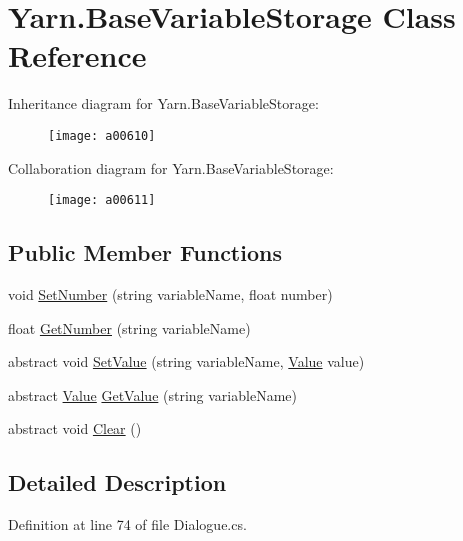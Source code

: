 \hypertarget{a00042}{\section{Yarn.\-Base\-Variable\-Storage Class Reference}
\label{a00042}
}


Inheritance diagram for Yarn.\-Base\-Variable\-Storage\-:
\nopagebreak
\begin{figure}[H]
\begin{center}
\leavevmode
\texttt{[image: a00610]}
\end{center}
\end{figure}


Collaboration diagram for Yarn.\-Base\-Variable\-Storage\-:
\nopagebreak
\begin{figure}[H]
\begin{center}
\leavevmode
\texttt{[image: a00611]}
\end{center}
\end{figure}
\subsection*{Public Member Functions}
\begin{DoxyCompactItemize}
\item 
void \hyperlink{a00042_a48b93de9cd7ae61d0cd9583c8330d3ee}{Set\-Number} (string variable\-Name, float number)
\item 
float \hyperlink{a00042_a1b7f7f4468b2463e7b47986d99362279}{Get\-Number} (string variable\-Name)
\item 
abstract void \hyperlink{a00042_a1c57d6d208b78abec0a670396771448e}{Set\-Value} (string variable\-Name, \hyperlink{a00187}{Value} value)
\item 
abstract \hyperlink{a00187}{Value} \hyperlink{a00042_a13b142df804d9842e97e628e252928e8}{Get\-Value} (string variable\-Name)
\item 
abstract void \hyperlink{a00042_a7e45c37f3662ce9f2643e306bb2b3adc}{Clear} ()
\end{DoxyCompactItemize}


\subsection{Detailed Description}


Definition at line 74 of file Dialogue.\-cs.



